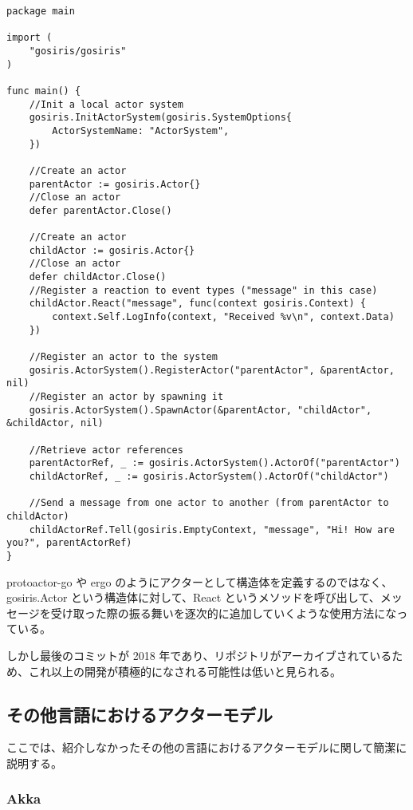 \begin{verbatim}
package main

import (
    "gosiris/gosiris"
)

func main() {
    //Init a local actor system
    gosiris.InitActorSystem(gosiris.SystemOptions{
        ActorSystemName: "ActorSystem",
    })

    //Create an actor
    parentActor := gosiris.Actor{}
    //Close an actor
    defer parentActor.Close()

    //Create an actor
    childActor := gosiris.Actor{}
    //Close an actor
    defer childActor.Close()
    //Register a reaction to event types ("message" in this case)
    childActor.React("message", func(context gosiris.Context) {
        context.Self.LogInfo(context, "Received %v\n", context.Data)
    })

    //Register an actor to the system
    gosiris.ActorSystem().RegisterActor("parentActor", &parentActor, nil)
    //Register an actor by spawning it
    gosiris.ActorSystem().SpawnActor(&parentActor, "childActor", &childActor, nil)

    //Retrieve actor references
    parentActorRef, _ := gosiris.ActorSystem().ActorOf("parentActor")
    childActorRef, _ := gosiris.ActorSystem().ActorOf("childActor")

    //Send a message from one actor to another (from parentActor to childActor)
    childActorRef.Tell(gosiris.EmptyContext, "message", "Hi! How are you?", parentActorRef)
}
\end{verbatim}

protoactor-go や ergo
のようにアクターとして構造体を定義するのではなく、gosiris.Actor
という構造体に対して、React
というメソッドを呼び出して、メッセージを受け取った際の振る舞いを逐次的に追加していくような使用方法になっている。

しかし最後のコミットが 2018
年であり、リポジトリがアーカイブされているため、これ以上の開発が積極的になされる可能性は低いと見られる。

\subsection{その他言語におけるアクターモデル}

ここでは、紹介しなかったその他の言語におけるアクターモデルに関して簡潔に説明する。

\subsubsection{Akka}

